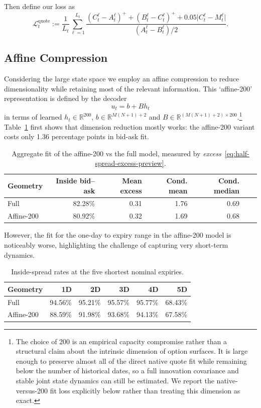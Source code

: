 \documentclass[11pt,a4paper]{article}
\newcommand{\R}{\mathbb{R}}
\DeclareRobustCommand{\eqlabel}[1]{\label{eq:#1}}                                     %
\DeclareRobustCommand{\eq}[1]{\begin{equation}\eqlabel{#1}}                           %
\DeclareRobustCommand{\eqend}{\end{equation}}                                         %
\begin{document}
Then define our loss as
\begin{equation}
  \mathcal L_t^{\mathrm{quote}}
  :=\frac{1}{L_t}\sum_{\ell=1}^{L_t}
    \frac{
      (C_t^\ell- A_t^\ell)^+
      +(B_t^\ell-C_t^\ell)^+
      +0.05\lvert C_t^\ell-M^\ell_t\rvert
    }{(A_t^\ell - B_t^\ell)/2}.
  \label{eq:production-quote-loss}
\end{equation}

\subsection{Affine Compression}

Considering the large state space we employ an affine compression to reduce dimensionality while retaining most of the relevant information.
This `affine-200' representation is defined by the decoder
\eq{affine-decoder-preview}
u_t=b+B h_t
\eqend
in terms of learned $h_t\in\R^{200}$, $b\in\R^{M(N+1)+2}$ and
$B\in\R^{(M(N+1)+2)\times200}$.\footnote{
The choice of 200 is an empirical capacity compromise rather than a structural
claim about the intrinsic dimension of option surfaces.  It is large enough
to preserve almost all of the direct native quote fit while remaining below
the number of historical dates, so a full innovation covariance and stable
joint state dynamics can still be estimated.  We report the native-versus-200
fit loss explicitly below rather than treating this dimension as exact.
}
Table~\ref{tab:aggregate-fit-preview} first shows that dimension reduction mostly works: the affine-200 variant costs only 1.36 percentage points
in bid-ask fit.
\begin{table}[H]
\centering
\begin{tabular}{lrrrrrr}
\toprule
Geometry & Inside bid--ask
  & Mean excess & Cond. mean & Cond. median\\
\midrule
Full & 82.28\% & 0.31 & 1.76 & 0.69\\
Affine-200 & 80.92\% & 0.32 & 1.69 & 0.68\\
\bottomrule
\end{tabular}
\caption{Aggregate fit of the affine-200 vs the full model, measured by \emph{excess}~\eqref{eq:half-spread-excess-preview}.}
\label{tab:aggregate-fit-preview}
\end{table}

However, the fit for the one-day to expiry range in the affine-200 model is noticeably worse,
highlighting the challenge of capturing very short-term dynamics.
\begin{table}[H]
\centering
\begin{tabular}{lrrrrr}
\toprule
Geometry & 1D & 2D & 3D & 4D & 5D\\
\midrule
Full & 94.56\% & 95.21\% & 95.57\% & 95.77\% & 68.43\%\\
Affine-200 & {\color{red}88.59\%} & 91.98\% & 93.68\% & 94.13\% & 67.58\%\\
\bottomrule
\end{tabular}
\caption{Inside-spread rates at the five shortest nominal expiries.}
\label{tab:short-fit}
\end{table}
\end{document}
